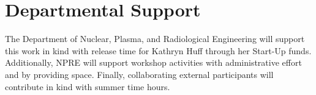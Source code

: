 \documentclass[11pt]{article}
\begin{document}
          \section{Departmental Support}
          The Department of Nuclear, Plasma, and Radiological Engineering will 
          support this work in kind with release time for Kathryn Huff through 
          her Start-Up funds.  Additionally, NPRE will support workshop activities 
          with administrative effort and by providing space. Finally, 
          collaborating external participants will contribute in kind with 
          summer time hours.


          
          


          
\end{document}

